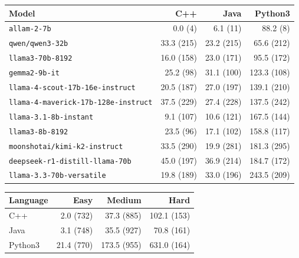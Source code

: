 \begin{tabular}{lrrr}
\hline\hline
\textbf{Model} & \textbf{C++} & \textbf{Java} & \textbf{Python3} \\
\hline
\texttt{allam-2-7b} & 0.0 {\scriptsize(4)} & 6.1 {\scriptsize(11)} & 88.2 {\scriptsize(8)} \\
\texttt{qwen/qwen3-32b} & 33.3 {\scriptsize(215)} & 23.2 {\scriptsize(215)} & 65.6 {\scriptsize(212)} \\
\texttt{llama3-70b-8192} & 16.0 {\scriptsize(158)} & 23.0 {\scriptsize(171)} & 95.5 {\scriptsize(172)} \\
\texttt{gemma2-9b-it} & 25.2 {\scriptsize(98)} & 31.1 {\scriptsize(100)} & 123.3 {\scriptsize(108)} \\
\texttt{llama-4-scout-17b-16e-instruct} & 20.5 {\scriptsize(187)} & 27.0 {\scriptsize(197)} & 139.1 {\scriptsize(210)} \\
\texttt{llama-4-maverick-17b-128e-instruct} & 37.5 {\scriptsize(229)} & 27.4 {\scriptsize(228)} & 137.5 {\scriptsize(242)} \\
\texttt{llama-3.1-8b-instant} & 9.1 {\scriptsize(107)} & 10.6 {\scriptsize(121)} & 167.5 {\scriptsize(144)} \\
\texttt{llama3-8b-8192} & 23.5 {\scriptsize(96)} & 17.1 {\scriptsize(102)} & 158.8 {\scriptsize(117)} \\
\texttt{moonshotai/kimi-k2-instruct} & 33.5 {\scriptsize(290)} & 19.9 {\scriptsize(281)} & 181.3 {\scriptsize(295)} \\
\texttt{deepseek-r1-distill-llama-70b} & 45.0 {\scriptsize(197)} & 36.9 {\scriptsize(214)} & 184.7 {\scriptsize(172)} \\
\texttt{llama-3.3-70b-versatile} & 19.8 {\scriptsize(189)} & 33.0 {\scriptsize(196)} & 243.5 {\scriptsize(209)} \\
\hline\hline
\end{tabular}

\begin{tabular}{lrrr}
\hline\hline
\textbf{Language} & \textbf{Easy} & \textbf{Medium} & \textbf{Hard} \\
\hline
C++ & 2.0 {\scriptsize(732)} & 37.3 {\scriptsize(885)} & 102.1 {\scriptsize(153)} \\
Java & 3.1 {\scriptsize(748)} & 35.5 {\scriptsize(927)} & 70.8 {\scriptsize(161)} \\
Python3 & 21.4 {\scriptsize(770)} & 173.5 {\scriptsize(955)} & 631.0 {\scriptsize(164)} \\
\hline\hline
\end{tabular}

